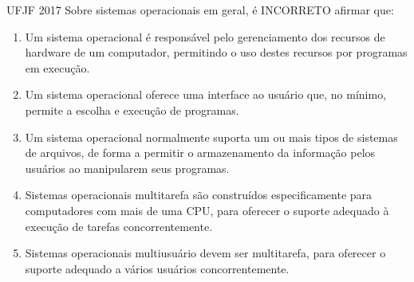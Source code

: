 \documentclass[aspectratio=169,
				xcolor=table]{beamer}
\begin{document}
	\begin{frame}{UFJF 2017}
		Sobre sistemas operacionais em geral, é INCORRETO afirmar que:
		\begin{enumerate}[a]
			\small
			\item Um sistema operacional é responsável pelo gerenciamento dos recursos de hardware de um computador, permitindo o uso destes recursos por programas em execução.  

			\item Um sistema operacional oferece uma interface ao usuário que, no mínimo, permite a escolha e execução de programas. 

			\item Um sistema operacional normalmente suporta um ou mais tipos de sistemas de arquivos, de forma a permitir o armazenamento da informação pelos usuários ao manipularem seus programas.  

			\item \alert{Sistemas operacionais multitarefa são construídos especificamente para computadores com mais de uma CPU, para oferecer o suporte adequado à execução de tarefas concorrentemente. }

			\item Sistemas operacionais multiusuário devem ser multitarefa, para oferecer o suporte adequado a vários usuários concorrentemente.

		\end{enumerate}

	\end{frame}	
	
\end{document}
